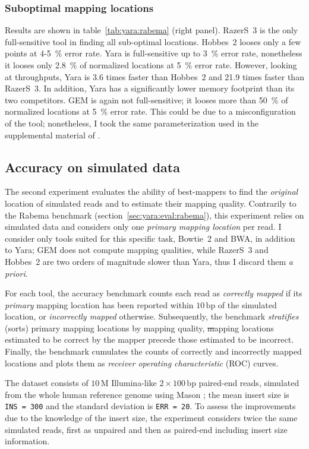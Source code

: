 \subsubsection{Suboptimal mapping locations}
Results are shown in table~\ref{tab:yara:rabema}  (right panel).
RazerS~3 is the only full-sensitive tool in finding all sub-optimal locations.
Hobbes~2 looses only a few points at 4-5~\% error rate.
Yara is full-sensitive up to 3~\% error rate, nonetheless it looses only 2.8~\% of normalized locations at 5~\% error rate.
However, looking at throughputs, Yara is 3.6 times faster than Hobbes~2 and 21.9 times faster than RazerS~3.
In addition, Yara has a significantly lower memory footprint than its two competitors.
GEM is again not full-sensitive; it looses more than 50~\% of normalized locations at 5~\% error rate.
This could be due to a misconfiguration of the tool; nonetheless, I took the same parameterization used in the supplemental material of \citep{MarcoSola2012}.

\subsection{Accuracy on simulated data}
\label{sec:yara:eval:accuracy}

The second experiment evaluates the ability of best-mappers to find the \emph{original} location of simulated reads and to estimate their mapping quality.
Contrarily to the Rabema benchmark (section~\ref{sec:yara:eval:rabema}), this experiment relies on simulated data and considers only one \emph{primary mapping location} per read.
I consider only tools suited for this specific task, \ie Bowtie~2 and BWA, in addition to Yara; GEM does not compute mapping qualities, while RazerS~3 and Hobbes~2 are two orders of magnitude slower than Yara, thus I discard them \emph{a priori}.

For each tool, the accuracy benchmark counts each read as \emph{correctly mapped} if its \emph{primary} mapping location has been reported within $10\,\text{bp}$ of the simulated location, or \emph{incorrectly mapped} otherwise.
Subsequently, the benchmark \emph{stratifies} (\ie sorts) primary mapping locations by mapping quality, \st mapping locations estimated to be correct by the mapper precede those estimated to be incorrect.
Finally, the benchmark cumulates the counts of correctly and incorrectly mapped locations and plots them as \emph{receiver operating characteristic} (ROC) curves.

The dataset consists of $10\,\text{M}$ Illumina-like $2 \times 100\,\text{bp}$ paired-end reads, simulated from the whole human reference genome using Mason \citep{Holtgrewe2010}; the mean insert size is \texttt{INS = 300} and the standard deviation is \texttt{ERR = 20}.
To assess the improvements due to the knowledge of the insert size, the experiment considers twice the same simulated reads, first as unpaired and then as paired-end including insert size information.

